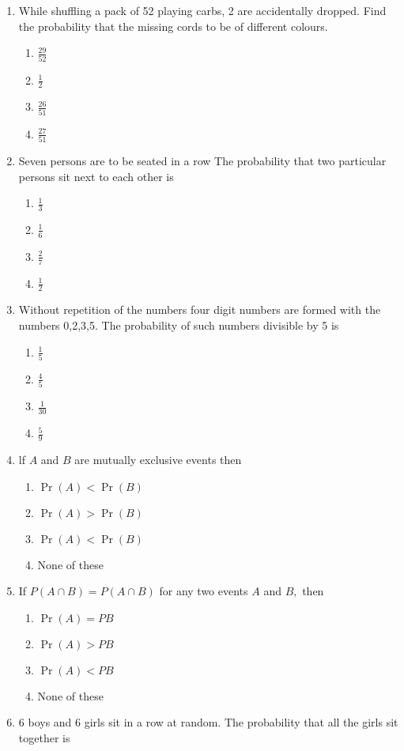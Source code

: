 \documentclass[12pt]{article}
\providecommand{\pr}[1]{\ensuremath{\Pr\left(#1\right)}}
\begin{document}
\begin{enumerate}
\item While shuffling a pack of 52 playing carbs, 2 are accidentally dropped. Find the probability that the missing cords to be of different colours.
	\begin{enumerate}
\item $\frac{29}{52}$
\item $\frac{1}{2}$
\item $\frac{26}{51}$
\item $\frac{27}{51}$
	\end{enumerate}
\item Seven persons are to be seated in a row The probability that two particular persons sit next to each other is
	\begin{enumerate}
\item $\frac{1}{3}$
\item $\frac{1}{6}$
\item $\frac{2}{7}$
\item $\frac{1}{2}$
	\end{enumerate}
\item Without repetition of the numbers four digit numbers are formed with the numbers 0,2,3,5. The probability of such numbers divisible by 5 is
	\begin{enumerate}
\item $\frac{1}{5}$
\item $\frac{4}{5}$
\item $\frac{1}{30}$
\item $\frac{5}{9}$
	\end{enumerate}
\item lf $A$ and $B$ are mutually exclusive events then
	\begin{enumerate}
\item $\pr{A}<\pr{B}$
\item $\pr{A}>\pr{B}$
\item $\pr{A}<\pr{B}$
\item None of these
	\end{enumerate}
\item If $P(A\cap B)=P(A\cap B)$ for any two events $A$ and $B,$ then
	\begin{enumerate}
\item $\pr{A}=P{B}$
\item $\pr{A}>P{B}$
\item $\pr{A}<P{B}$
\item None of these
	\end{enumerate}
\item 6 boys and 6 girls sit in a row at random. The probability that all the girls sit together is

\end{enumerate}
\end{document}
